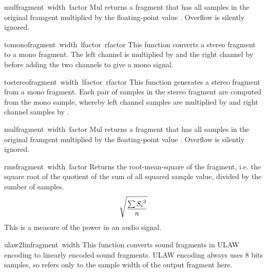 \begin{funcdesc}{mul}{fragment\, width\, factor}
Mul returns a fragment that has all samples in the original framgent
multiplied by the floating-point value . Overflow is
silently ignored.
\end{funcdesc}

\begin{funcdesc}{tomono}{fragment\, width\, lfactor\, rfactor} 
This function converts a stereo fragment to a mono fragment. The left
channel is multiplied by  and the right channel by
 before adding the two channels to give a mono signal.
\end{funcdesc}

\begin{funcdesc}{tostereo}{fragment\, width\, lfactor\, rfactor}
This function generates a stereo fragment from a mono fragment. Each
pair of samples in the stereo fragment are computed from the mono
sample, whereby left channel samples are multiplied by 
and right channel samples by .
\end{funcdesc}

\begin{funcdesc}{mul}{fragment\, width\, factor}
Mul returns a fragment that has all samples in the original framgent
multiplied by the floating-point value . Overflow is
silently ignored.
\end{funcdesc}

\begin{funcdesc}{rms}{fragment\, width\, factor}
Returns the root-mean-square of the fragment, i.e.
\iftexi
the square root of the quotient of the sum of all squared sample value,
divided by the sumber of samples.
\else
\begin{displaymath}
\catcode`_=8
\sqrt{\frac{\sum{{S_{i}}^{2}}}{n}}
\end{displaymath}
\fi
This is a measure of the power in an audio signal.
\end{funcdesc}

\begin{funcdesc}{ulaw2lin}{fragment\, width}
This function converts sound fragments in ULAW encoding to linearly
encoded sound fragments. ULAW encoding always uses 8 bits samples, so
 refers only to the sample width of the output fragment here.
\end{funcdesc}

